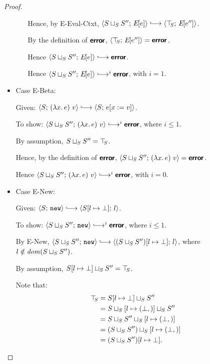 \begin{proof}
\begin{itemize}
\begin{itemize}
          Hence, by {\sc E-Eval-Ctxt},
          $\config{\lubstore{S}{S''}}{\E{e}} \parstepsto
          \config{\topS}{\E{e''}}$.

          By the definition of $\textbf{\textsf{error}}$, $\langle \top\hspace{-0.85mm}_{S};\, E\hspace{-1mm}\left[e''\right] \rangle =
          \textbf{\textsf{error}}$.

          Hence $\config{\lubstore{S}{S''}}{\E{e}} \parstepsto
          \error$.

          Hence $\config{\lubstore{S}{S''}}{\E{e}} \parstepsto^i
          \error$, with $i = 1$.

      \end{itemize}

    \item Case {\sc E-Beta}:

      Given: $\config{S}{\app{(\lam{x}{e})}{v}} \parstepsto
      \config{S}{\subst{e}{x}{v}}$.

      To show: $\config{\lubstore{S}{S''}}{\app{(\lam{x}{e})}{v}}
      \parstepsto^i \error$, where $i \leq 1$.

      By assumption, $S \sqcup_{S} S'' = \top\hspace{-0.85mm}_{S}$.

      Hence, by the definition of $\textbf{\textsf{error}}$,
      $\langle S \sqcup_{S} S'';\, (\lambda x.\,e)~v \rangle = \textbf{\textsf{error}}$.

      Hence $\config{\lubstore{S}{S''}}{\app{(\lam{x}{e})}{v}}
      \parstepsto^i \error$, with $i = 0$.

    \item Case {\sc E-New}:

      Given: $\config{S}{\NEW} \parstepsto
      \config{\extSRaw{S}{l}{\bot}}{l}$.

      To show: $\config{\lubstore{S}{S''}}{\NEW} \parstepsto^i
      \error$, where $i \leq 1$.

      By {\sc E-New}, $\config{\lubstore{S}{S''}}{\NEW} \parstepsto
      \config{\extSRaw{(\lubstore{S}{S''})}{l}{\bot}}{l}$,
      where $l \notin \mathit{dom}(S \sqcup_{S} S'')$.


      By assumption, $S[l \mapsto \bot] \sqcup_{S} S''
      = \top\hspace{-0.85mm}_{S}$.

      Note that:
      \begin{align*}
        \top\hspace{-0.85mm}_{S} &= S[l \mapsto \bot] \sqcup_{S} S'' \\ &=
        S \sqcup_{S} \left[ l \mapsto (\bot, \right)] \sqcup_{S} S''
        \\ &=
        S \sqcup_{S} S'' \sqcup_{S} \left[ l \mapsto (\bot, \right)]
        \\ &=
        (S \sqcup_{S} S'') \sqcup_{S} \left[ l \mapsto (\bot, \right)]
        \\ &= (S \sqcup_{S} S'')[l \mapsto \bot] .
      \end{align*}


\end{itemize}
\end{proof}
